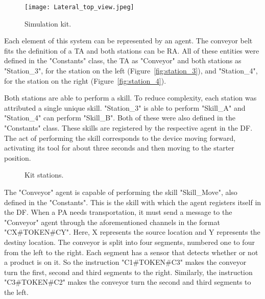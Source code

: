 \begin{figure}[h!]
	\centering
	\texttt{[image: Lateral\_top\_view.jpeg]}
	\caption{Simulation kit.}
	\label{fig:physical_system}
\end{figure}

Each element of this system can be represented by an agent. The conveyor belt fits the definition of a \acrlong{TA} and both stations can be \acrlong{RA}. All of these entities were defined in the "Constants" class, the \acrshort{TA} as "Conveyor" and both stations as "Station\_3", for the station on the left (Figure~\ref{fig:station_3}), and "Station\_4", for the station on the right (Figure~\ref{fig:station_4}). 

Both stations are able to perform a skill. To reduce complexity, each station was attributed a single unique skill. "Station\_3" is able to perform "Skill\_A" and "Station\_4" can perform "Skill\_B". Both of these were also defined in the "Constants" class. These skills are registered by the respective agent in the \acrshort{DF}. The act of performing the skill corresponds to the device moving forward, activating its tool for about three seconds and then moving to the starter position.

\begin{figure}[h!]
	\centering
	\hspace{0.80cm}
	\caption{Kit stations.}
	\label{fig:stations}
\end{figure}

The "Conveyor" agent is capable of performing the skill "Skill\_Move", also defined in the "Constants". This is the skill with which the agent registers itself in the \acrshort{DF}. When a \acrlong{PA} needs transportation, it must send a message to the "Conveyor" agent through the aforementioned channels in the format "CX\#TOKEN\#CY". Here, X represents the source location and Y represents the destiny location. The conveyor is split into four segments, numbered one to four from the left to the right. Each segment has a sensor that detects whether or not a product is on it. So the instruction "C1\#TOKEN\#C3" makes the conveyor turn the first, second and third segments to the right. Similarly, the instruction "C3\#TOKEN\#C2" makes the conveyor turn the second and third segments to the left.\\

